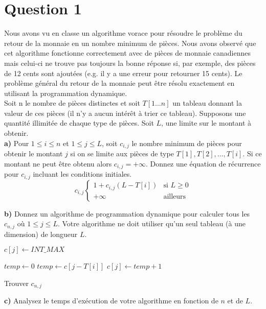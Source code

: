 \documentclass[devoir3.tex]{subfiles}
\begin{document}
\section*{Question 1}
Nous avons vu en classe un algorithme vorace pour résoudre le problème du retour de la monnaie en un nombre minimum de pièces. Nous avons observé que cet algorithme fonctionne correctement avec de pièces de monnaie canadiennes mais celui-ci ne trouve pas toujours la bonne réponse si, par exemple, des pièces de 12 cents sont ajoutées (e.g. il y a une erreur pour retourner 15 cents). Le problème général du retour de la monnaie peut être résolu exactement en utilisant la programmation dynamique. \\[0.2cm]
Soit n le nombre de pièces distinctes et soit \(T[1 \dots n]\) un tableau donnant la valeur de ces pièces (il n’y a aucun intérêt à trier ce tableau). Supposons une quantité illimitée de chaque type de pièces. Soit \(L\), une limite sur le montant à obtenir. \\

\textbf{a)} Pour \(1 \leq i \leq n\) et \(1 \leq j \leq L\), soit \(c_{i,j}\) le nombre minimum de pièces pour obtenir le montant \(j\) si on se limite aux pièces de type \(T[1], T[2], \dots , T[i]\). Si ce montant ne peut être obtenu alors \(c_{i,j} = +\infty \). Donnez une équation de récurrence pour \(c_{i,j}\) incluant les conditions initiales. \\

\[c_{i,j} \begin{cases}
      1+c_{i,j}(L-T[i]) & \text{si } L \geq 0 \\
      +\infty & \text{ailleurs }
   \end{cases}
\]

\textbf{b)} Donnez un algorithme de programmation dynamique pour calculer tous les \(c_{n,j}\) où \(1 \leq j \leq L\). Votre algorithme ne doit utiliser qu’un seul tableau (à une dimension) de longueur \(L\). \\

\begin{algorithm}[H]


    {
    	\( c[j] \gets INT\_ MAX \)
    }
         
    {
    	{
    		{
				{
					\(temp \gets 0\)
				}
				\Else
				{
					\(temp \gets c[j-T[i]]\)
				}
				{
					\(c[j] \gets temp + 1\) 
				}
    		}
    	}
    }   

      \caption{Trouver \(c_{n,j}\)} 
\end{algorithm}

\textbf{c)} Analysez le temps d’exécution de votre algorithme en fonction de \(n\)
et de \(L\).
\end{document}
